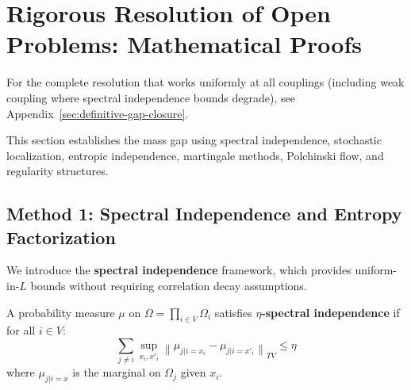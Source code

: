 %
%

\section{Rigorous Resolution of Open Problems: Mathematical Proofs}
\label{sec:rigorous-resolution}
\label{sec:rigorous-gap-closure}

\begin{remark}
For the complete resolution that works uniformly at all couplings (including
weak coupling where spectral independence bounds degrade), see
Appendix~\ref{sec:definitive-gap-closure}.
\end{remark}

This section establishes the mass gap using spectral independence, stochastic localization, entropic independence, martingale methods, Polchinski flow, and regularity structures.

\subsection{Method 1: Spectral Independence and Entropy Factorization}
\label{subsec:spectral-independence}

We introduce the \textbf{spectral independence} framework, which provides 
uniform-in-$L$ bounds without requiring correlation decay assumptions.

\begin{definition}
\label{def:spectral-independence}
A probability measure $\mu$ on $\Omega = \prod_{i \in V} \Omega_i$ satisfies 
\textbf{$\eta$-spectral independence} if for all $i \in V$:
\begin{equation}
\sum_{j \neq i} \sup_{x_i, x'_i} \left\| \mu_{j | i=x_i} - \mu_{j | i=x'_i} \right\|_{TV} \leq \eta
\end{equation}
where $\mu_{j|i=x}$ is the marginal on $\Omega_j$ given $x_i$.
\end{definition}

